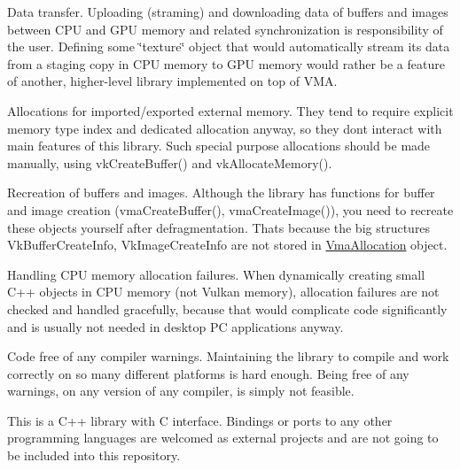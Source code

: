 \begin{DoxyItemize}
\item Data transfer. Uploading (straming) and downloading data of buffers and images between C\+PU and G\+PU memory and related synchronization is responsibility of the user. Defining some \char`\"{}texture\char`\"{} object that would automatically stream its data from a staging copy in C\+PU memory to G\+PU memory would rather be a feature of another, higher-\/level library implemented on top of V\+MA.
\item Allocations for imported/exported external memory. They tend to require explicit memory type index and dedicated allocation anyway, so they don\textquotesingle{}t interact with main features of this library. Such special purpose allocations should be made manually, using {\ttfamily vk\+Create\+Buffer()} and {\ttfamily vk\+Allocate\+Memory()}.
\item Recreation of buffers and images. Although the library has functions for buffer and image creation (vma\+Create\+Buffer(), vma\+Create\+Image()), you need to recreate these objects yourself after defragmentation. That\textquotesingle{}s because the big structures {\ttfamily Vk\+Buffer\+Create\+Info}, {\ttfamily Vk\+Image\+Create\+Info} are not stored in \hyperlink{structVmaAllocation}{Vma\+Allocation} object.
\item Handling C\+PU memory allocation failures. When dynamically creating small C++ objects in C\+PU memory (not Vulkan memory), allocation failures are not checked and handled gracefully, because that would complicate code significantly and is usually not needed in desktop PC applications anyway.
\item Code free of any compiler warnings. Maintaining the library to compile and work correctly on so many different platforms is hard enough. Being free of any warnings, on any version of any compiler, is simply not feasible.
\item This is a C++ library with C interface. Bindings or ports to any other programming languages are welcomed as external projects and are not going to be included into this repository. 
\end{DoxyItemize}